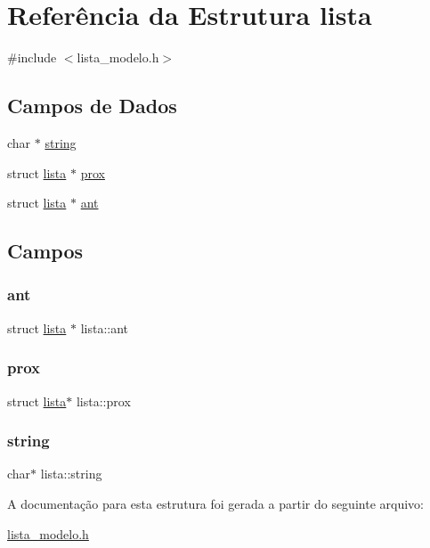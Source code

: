 \hypertarget{structlista}{}\section{Referência da Estrutura lista}
\label{structlista}


{\ttfamily \#include $<$lista\+\_\+modelo.\+h$>$}

\subsection*{Campos de Dados}
\begin{DoxyCompactItemize}
\item 
char $\ast$ \hyperlink{structlista_a1ba5a9f199d6bf09cb40c905d50685f0}{string}
\item 
struct \hyperlink{structlista}{lista} $\ast$ \hyperlink{structlista_a3b0e375147c1163d74544fd206a1f1de}{prox}
\item 
struct \hyperlink{structlista}{lista} $\ast$ \hyperlink{structlista_a92e5a9da9a7788d2a85de746a88b336f}{ant}
\end{DoxyCompactItemize}


\subsection{Campos}
\mbox{\label{structlista_a92e5a9da9a7788d2a85de746a88b336f}} 
\subsubsection{\texorpdfstring{ant}{ant}}
{\footnotesize\ttfamily struct \hyperlink{structlista}{lista} $\ast$ lista\+::ant}

\mbox{\label{structlista_a3b0e375147c1163d74544fd206a1f1de}} 
\subsubsection{\texorpdfstring{prox}{prox}}
{\footnotesize\ttfamily struct \hyperlink{structlista}{lista}$\ast$ lista\+::prox}

\mbox{\label{structlista_a1ba5a9f199d6bf09cb40c905d50685f0}} 
\subsubsection{\texorpdfstring{string}{string}}
{\footnotesize\ttfamily char$\ast$ lista\+::string}



A documentação para esta estrutura foi gerada a partir do seguinte arquivo\+:\begin{DoxyCompactItemize}
\item 
\hyperlink{lista__modelo_8h}{lista\+\_\+modelo.\+h}\end{DoxyCompactItemize}
